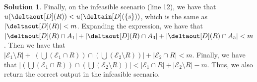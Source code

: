 \documentclass[11pt,leqno,final]{amsart}
\theoremstyle{definition}
\newtheorem{solution}{Solution}
\begin{document}
\begin{solution}
  Finally, on the infeasible scenario (line 12), we have that $u(\deltaout[D](R)) < u(\deltain[D](\{s\}))$, which is the same as $|\deltaout[D](R)| < m$. Expanding the expression, we have that $|\deltaout[D](R) \cap A_1| + |\deltaout[D](R) \cap A_3| + |\deltaout[D](R) \cap A_5|< m$. Then we have that $|\mathcal{E}_1 \setminus R| + |(\bigcup{(\mathcal{E}_1 \cap R)}) \cap (\bigcup{(\mathcal{E}_2 \setminus R)})| + |\mathcal{E}_2 \cap R| < m$. Finally, we have that $ |(\bigcup{(\mathcal{E}_1 \cap R)}) \cap (\bigcup{(\mathcal{E}_2 \setminus R)})| < |\mathcal{E}_1 \cap R| + |\mathcal{E}_2 \setminus R| - m$. Thus, we also return the correct output in the infeasible scenario.
 
\end{solution}
\end{document}
